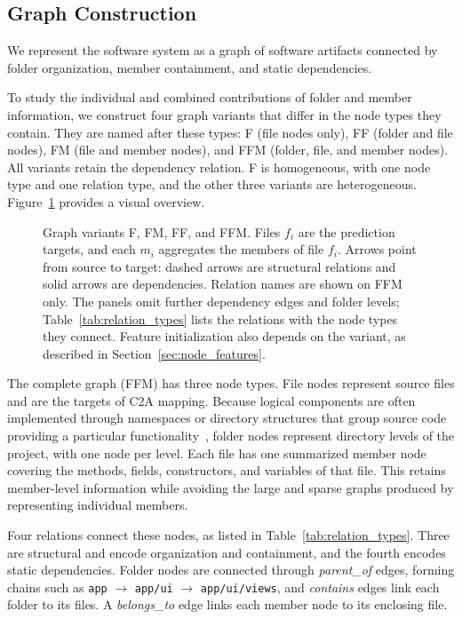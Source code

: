 \subsection{Graph Construction\label{sec:het_graph}\label{sec:graph_variants}}

We represent the software system as a graph of software artifacts connected by folder organization, member containment, and static dependencies.

To study the individual and combined contributions of folder and member information, we construct four graph variants that differ in the node types they contain. They are named after these types: F (file nodes only), FF (folder and file nodes), FM (file and member nodes), and FFM (folder, file, and member nodes). All variants retain the dependency relation. F is homogeneous, with one node type and one relation type, and the other three variants are heterogeneous. Figure~\ref{fig:graph_variants_overview} provides a visual overview.

\begin{figure}[h]
\centering
\resizebox{0.95\linewidth}{!}{}
\caption{Graph variants F, FM, FF, and FFM. Files $f_i$ are the prediction targets, and each $m_i$ aggregates the members of file $f_i$. Arrows point from source to target: dashed arrows are structural relations and solid arrows are dependencies. Relation names are shown on FFM only. The panels omit further dependency edges and folder levels; Table~\ref{tab:relation_types} lists the relations with the node types they connect. Feature initialization also depends on the variant, as described in Section~\ref{sec:node_features}.}
\label{fig:graph_variants_overview}
\end{figure}

The complete graph (FFM) has three node types. File nodes represent source files and are the targets of C2A mapping. Because logical components are often implemented through namespaces or directory structures that group source code providing a particular functionality~\cite{fundamentals_sa, garcia2013}, folder nodes represent directory levels of the project, with one node per level. Each file has one summarized member node covering the methods, fields, constructors, and variables of that file. This retains member-level information while avoiding the large and sparse graphs produced by representing individual members.

Four relations connect these nodes, as listed in Table~\ref{tab:relation_types}. Three are structural and encode organization and containment, and the fourth encodes static dependencies. Folder nodes are connected through \emph{parent\_of} edges, forming chains such as \texttt{app} $\rightarrow$ \texttt{app/ui} $\rightarrow$ \texttt{app/ui/views}, and \emph{contains} edges link each folder to its files. A \emph{belongs\_to} edge links each member node to its enclosing file.

